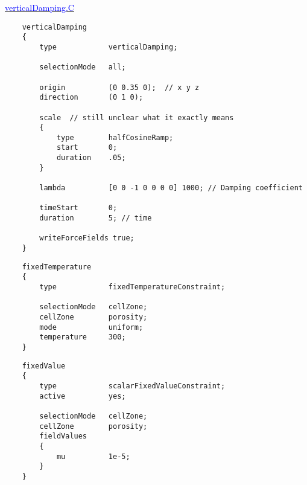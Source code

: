 \documentclass[a4paper, 12pt]{article}
\numberwithin{equation}{section}
\newcommand{\blue}[1]{\textcolor{blue}{#1}}
\begin{document}
    \begin{minipage}{\textwidth}
    \vspace{12pt}
    \href{
    https://github.com/OpenFOAM/OpenFOAM-12/blob/master/src/waves/fvModels/verticalDamping/verticalDamping.C
    }{\blue{verticalDamping.C}}

    {
    \begin{verbatim}
    verticalDamping
    {
        type            verticalDamping;

        selectionMode   all;

        origin          (0 0.35 0);  // x y z
        direction       (0 1 0);

        scale  // still unclear what it exactly means
        {
            type        halfCosineRamp;
            start       0;
            duration    .05;
        }

        lambda          [0 0 -1 0 0 0 0] 1000; // Damping coefficient

        timeStart       0;
        duration        5; // time

        writeForceFields true;
    }
    \end{verbatim}
    }
    \end{minipage}

    \begin{minipage}{\textwidth}
    \vspace{12pt}
    {
    \begin{verbatim}
    fixedTemperature
    {
        type            fixedTemperatureConstraint;

        selectionMode   cellZone;
        cellZone        porosity;
        mode            uniform;
        temperature     300;
    }
    \end{verbatim}
    }
    \end{minipage}

    \begin{minipage}{\textwidth}
    \vspace{12pt}
    {
    \begin{verbatim}
    fixedValue
    {
        type            scalarFixedValueConstraint;
        active          yes;

        selectionMode   cellZone;
        cellZone        porosity;
        fieldValues
        {
            mu          1e-5;
        }
    }
    \end{verbatim}
    }
    \end{minipage}
\end{document}

